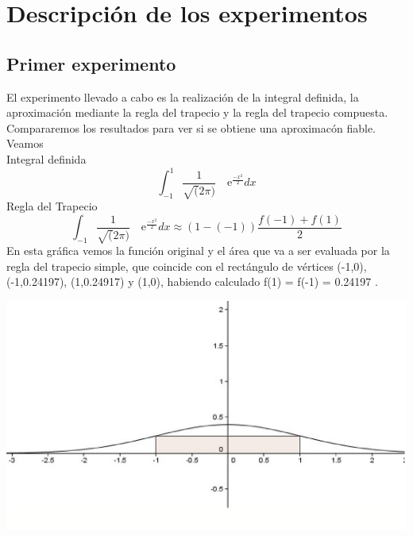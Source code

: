 


\section{Descripción de los experimentos}
\label{3:sec:1}
\parindent=0.5cm
\raggedright
\subsection{Primer experimento}
El experimento llevado a cabo es la realización de la integral definida, la aproximación
mediante la regla del trapecio y la regla del trapecio compuesta. Compararemos los resultados para ver si se obtiene una aproximacón fiable.
 Veamos\\
Integral definida 
\[
\int_{-1}^{1} \frac{1}{\sqrt(2\pi)} \quad\text{e}^{\frac{-x^2}{2}}dx
\]
Regla del Trapecio
\[
\int_{-1}^{} \frac{1}{\sqrt(2\pi)} \quad\text{e}^{\frac{-x^2}{2}}dx\approx\left(1-(-1)\right)\frac{f(-1)+f(1)}{2}
\]
En esta gráfica vemos la función original y el área que va a ser evaluada por la regla del trapecio simple, que coincide con el rectángulo de vértices (-1,0), (-1,0.24197), (1,0.24917)
 y (1,0), habiendo calculado f(1) = f(-1) = 0.24197 .

\includegraphics[width=1.15\textwidth]{images/trasim}

